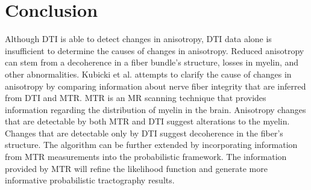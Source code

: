 \chapter{Conclusion}
Although DTI is able to detect changes in anisotropy, DTI data alone is insufficient to determine the causes of changes in anisotropy.  Reduced anisotropy can stem from a decoherence in a fiber bundle's structure, losses in myelin, and other abnormalities.  Kubicki et al. \cite{kubickiNI05} attempts to clarify the cause of changes in anisotropy by comparing information about nerve fiber integrity that are inferred from DTI and MTR.  MTR is an MR scanning technique that provides information regarding the distribution of myelin in the brain. Anisotropy changes that are detectable by both MTR and DTI suggest alterations to the myelin.  Changes that are detectable only by DTI suggest decoherence in the fiber's structure.
The algorithm can be further extended by incorporating information from MTR measurements \cite{kubickiNI05} into the probabilistic framework.  The information provided by MTR will refine the likelihood function and generate more informative probabilistic tractography results.



